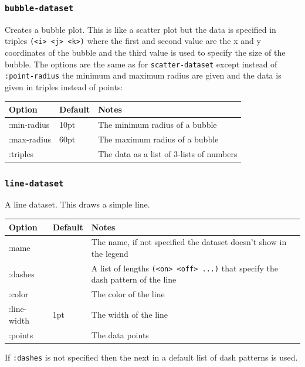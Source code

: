 \documentclass{article}
\begin{document}
\subsubsection{\tt bubble-dataset}

Creates a bubble plot.  This is like a scatter plot but the data is
specified in triples {\tt (<i> <j> <k>)} where the first and second
value are the x and y coordinates of the bubble and the third value is
used to specify the size of the bubble.  The options are the same as
for {\tt scatter-dataset} except instead of {\tt :point-radius} the
minimum and maximum radius are given and the data is given in triples
instead of points:

\begin{center}
\begin{tabular}{lll}
Option & Default & Notes \\
\hline
:min-radius & 10pt & The minimum radius of a bubble\\
:max-radius & 60pt & The maximum radius of a bubble\\
:triples & & The data as a list of 3-lists of numbers\\
\end{tabular}
\end{center}

\subsubsection{\tt line-dataset}

A line dataset.  This draws a simple line.

\begin{center}
\begin{tabular}{lll}
Option & Default & Notes \\
\hline
:name & & The name, if not specified the dataset doesn't show in
the legend\\
:dashes & & A list of lengths {\tt (<on> <off> ...)} that specify the
dash pattern of the line\\
:color & & The color of the line\\
:line-width & 1pt & The width of the line\\
:points & & The data points\\
\end{tabular}
\end{center}

If {\tt :dashes} is not specified then the next in a default list of
dash patterns is used.
\end{document}
